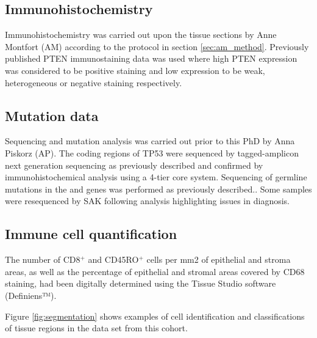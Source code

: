 \subsection{Immunohistochemistry}
Immunohistochemistry was carried out upon the tissue sections by Anne Montfort (AM) according to the protocol in section \ref{sec:am_method}. Previously published PTEN immunostaining data was used where high PTEN expression was considered to be positive staining and low expression to be weak, heterogeneous or negative staining respectively\cite{PTEN_brenton}.

\subsection{Mutation data}

Sequencing and mutation analysis was carried out prior to this PhD by Anna Piskorz (AP). The coding regions of TP53 were sequenced by tagged-amplicon next generation sequencing as previously described\cite{20} and confirmed by immunohistochemical analysis using a 4-tier core system\cite{21}. Sequencing of germline mutations in the   and  genes was performed as previously described.\cite{sequencing}. Some samples were resequenced by SAK following analysis highlighting issues in diagnosis.

\subsection{Immune cell quantification}
 The number of CD8$^+$ and CD45RO$^+$ cells per mm2 of epithelial and stroma areas, as well as the percentage of epithelial and stromal areas covered by CD68 staining, had been digitally determined using the Tissue Studio software (Definiens™).

Figure \ref{fig:segmentation} shows examples of cell identification and classifications of tissue regions in the data set from this cohort.


